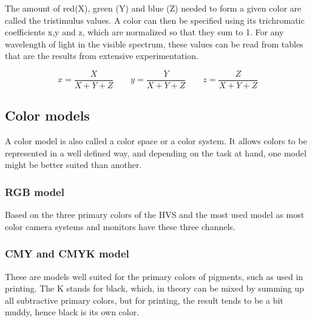 The amount of red(X), green (Y) and blue (Z) needed to form a given color are called the tristimulus values.
A color can then be specified using its trichromatic coefficients x,y and z, which are normalized so that they sum to 1.
For any wavelength of light in the visible spectrum, these values can be read from tables that are the results from extensive experimentation.

\[
	x = \frac{X}{X+Y+Z} \qquad
	y = \frac{Y}{X+Y+Z} \qquad
	z = \frac{Z}{X+Y+Z}
\]



\subsection{Color models }
A color model is also called a color space or a color system. It allows colors to be represented in a well defined way, and depending on the task at hand, one model might be better suited than another.

\subsubsection{RGB model }
Based on the three primary colors of the HVS and the most used model as most color camera systems and monitors have these three channels.


\subsubsection{CMY and CMYK model }
These are models well suited for the primary colors of pigments, such as used in printing. The K stands for black, which, in theory can be mixed by summing up all subtractive primary colors, but for printing, the result tends to be a bit muddy, hence black is its own color.

